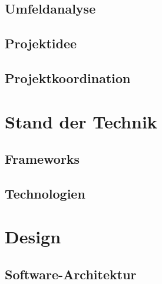 \documentclass[12pt]{article}
\begin{document}
\subsection{Umfeldanalyse}
\label{subsec:umfeldanalyse}


\newpage

\subsection{Projektidee}
\label{subsec:projektidee}


\subsection{Projektkoordination}
\label{subsec:projektkoordination}


\newpage

\section{Stand der Technik}
\label{sec:standdertechnik}


\subsection{Frameworks}
\label{subsec:frameworks}


\newpage

\subsection{Technologien}
\label{subsec:technologien}


\newpage %

\section{Design}
\label{sec:design}


\subsection{Software-Architektur}
\label{subsec:softwarearchitektur}

\end{document}

